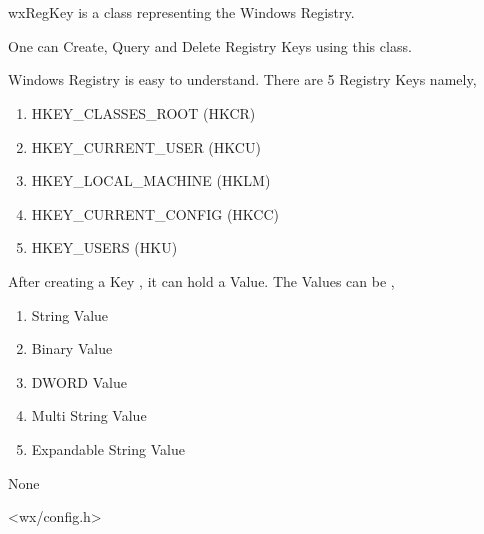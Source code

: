 
\section{}\label{wxregkey}

wxRegKey is a class representing the Windows Registry. 

One can Create, Query and Delete Registry Keys using this class.

Windows Registry is easy to understand. There are 5 Registry Keys namely,

\begin{enumerate}\itemsep=0pt
\item HKEY\_CLASSES\_ROOT (HKCR)
\item HKEY\_CURRENT\_USER (HKCU)
\item HKEY\_LOCAL\_MACHINE (HKLM)
\item HKEY\_CURRENT\_CONFIG (HKCC)
\item HKEY\_USERS (HKU)
\end{enumerate}

After creating a Key , it can hold a Value. The Values can be ,

\begin{enumerate}\itemsep=0pt
\item String Value
\item Binary Value
\item DWORD Value
\item Multi String Value
\item Expandable String Value
\end{enumerate}


None


<wx/config.h>


